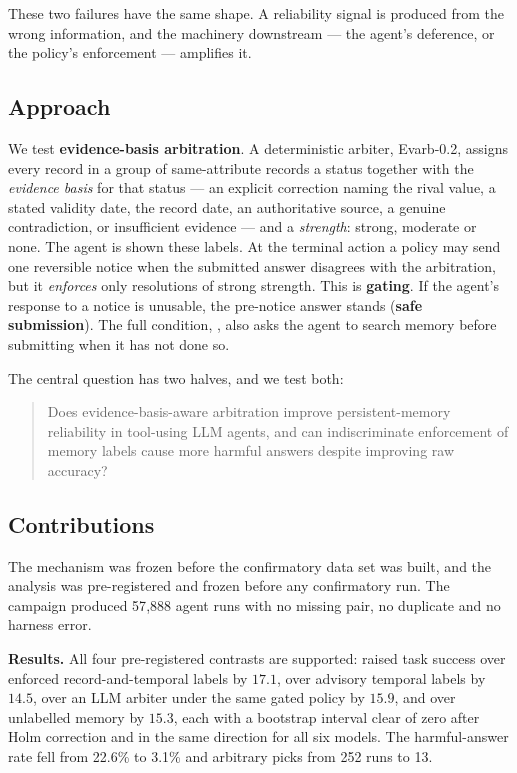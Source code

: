 These two failures have the same shape. A reliability signal is produced from the wrong information, and the
machinery downstream --- the agent's deference, or the policy's enforcement --- amplifies it.

\subsection{Approach}

We test \textbf{evidence-basis arbitration}. A deterministic arbiter, Evarb-0.2, assigns every record in a group of
same-attribute records a status together with the \emph{evidence basis} for that status --- an explicit correction
naming the rival value, a stated validity date, the record date, an authoritative source, a genuine contradiction,
or insufficient evidence --- and a \emph{strength}: strong, moderate or none. The agent is shown these labels. At the
terminal action a policy may send one reversible notice when the submitted answer disagrees with the arbitration,
but it \emph{enforces} only resolutions of strong strength. This is \textbf{gating}. If the agent's response to a
notice is unusable, the pre-notice answer stands (\textbf{safe submission}). The full condition, , also
asks the agent to search memory before submitting when it has not done so.

The central question has two halves, and we test both:

\begin{quote}
Does evidence-basis-aware arbitration improve persistent-memory reliability in tool-using LLM agents, and can
indiscriminate enforcement of memory labels cause more harmful answers despite improving raw accuracy?
\end{quote}

\subsection{Contributions}



The mechanism was frozen before the confirmatory data set was built, and the analysis was pre-registered and frozen
before any confirmatory run. The campaign produced 57{,}888 agent runs with no missing pair, no duplicate and no
harness error.

\textbf{Results.} All four pre-registered contrasts are supported:  raised task success over enforced
record-and-temporal labels by $17.1$\pp, over advisory temporal labels by $14.5$\pp, over an LLM arbiter under the
same gated policy by $15.9$\pp, and over unlabelled memory by $15.3$\pp, each with a bootstrap interval clear of
zero after Holm correction and in the same direction for all six models. The harmful-answer rate fell from 22.6\% to
3.1\% and arbitrary picks from 252 runs to 13.

